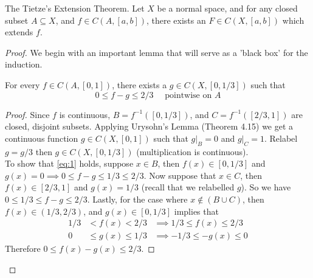 \documentclass[../../main.tex]{subfiles}
\begin{document}
\begin{wts}
The Tietze's Extension Theorem. Let $X$ be a normal space, and for any closed subset $A\subseteq X$, and $f\in C(A,[a,b])$, there exists an $F\in C(X,[a,b])$ which extends $f$.
\end{wts}
\begin{proof}
We begin with an important lemma that will serve as a 'black box' for the induction.
\begin{lemma}\label{lemma:1}
For every $f\in C(A,[0,1])$, there exists a $g\in C(X, [0, 1/3])$ such that 
\begin{equation}\label{eq:1}
0\leq f-g\leq 2/3 \quad\textrm{ pointwise on } A    
\end{equation}
\end{lemma}
\begin{proof}
Since $f$ is continuous, $B=f^{-1}([0,1/3])$, and $C=f^{-1}([2/3,1])$ are closed, disjoint subsets. Applying Urysohn's Lemma (Theorem 4.15) we get a continuous function $g\in C(X,[0,1])$ such that $g|_B = 0$ and $g|_C = 1$. Relabel $g=g/3$ then $g\in C(X,[0,1/3])$ (multiplication is continuous).\\

To show that \eqref{eq:1} holds, suppose $x\in B$, then $f(x)\in[0,1/3]$ and $g(x)=0\implies 0\leq f-g\leq 1/3\leq 2/3$. Now suppose that $x\in C$, then $f(x)\in[2/3,1]$ and $g(x)=1/3$ (recall that we relabelled $g$). So we have $0\leq 1/3\leq f-g\leq 2/3$. Lastly, for the case where $x\notin (B\cup C)$, then $f(x)\in (1/3, 2/3)$, and $g(x)\in[0, 1/3]$ implies that 
\begin{align*}
    1/3 &<    f(x) <    2/3 &\implies 1/3 \leq   f(x) \leq 2/3\\
    0   &\leq g(x) \leq 1/3 &\implies -1/3 \leq -g(x) \leq 0    
\end{align*}
Therefore $0\leq f(x)-g(x)\leq 2/3$.
\end{proof}


\end{proof}
\end{document}
